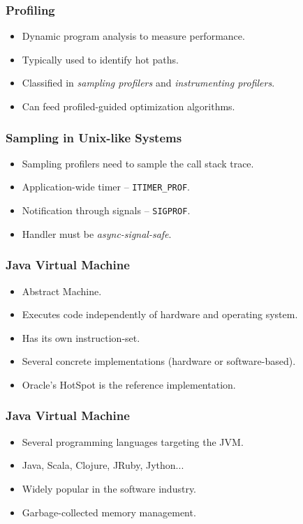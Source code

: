 \documentclass{beamer}
\begin{document}
\begin{frame}
\frametitle{Profiling}
\begin{itemize}
\item Dynamic program analysis to measure performance.
\item Typically used to identify hot paths.
\item Classified in \emph{sampling profilers} and \emph{instrumenting profilers}.
\item Can feed profiled-guided optimization algorithms.
\end{itemize}
\end{frame}

\begin{frame}
\frametitle{Sampling in Unix-like Systems}
\begin{itemize}
\item Sampling profilers need to sample the call stack trace.
\item Application-wide timer -- \lstinline{ITIMER_PROF}.
\item Notification through signals -- \lstinline{SIGPROF}.
\item Handler must be \emph{async-signal-safe}.
\end{itemize}
\end{frame}

\begin{frame}
\frametitle{Java Virtual Machine}
\begin{itemize}
\item Abstract Machine.
\item Executes code independently of hardware and operating system.
\item Has its own instruction-set.
\item Several concrete implementations (hardware or software-based).
\item Oracle's HotSpot is the reference implementation.
\end{itemize}
\end{frame}

\begin{frame}
\frametitle{Java Virtual Machine}
\begin{itemize}
\item Several programming languages targeting the JVM.
\item Java, Scala, Clojure, JRuby, Jython...
\item Widely popular in the software industry.
\item Garbage-collected memory management.
\end{itemize}
\end{frame}
\end{document}
